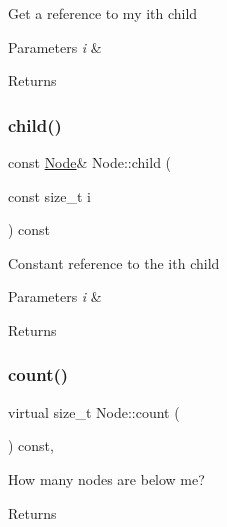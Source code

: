 Get a reference to my i\textquotesingle{}th child 
\begin{DoxyParams}{Parameters}
{\em i} & \\
\hline
\end{DoxyParams}
\begin{DoxyReturn}{Returns}

\end{DoxyReturn}
\mbox{\label{class_node_acc2b20cdba470853f1c137e26546ed3c}} 
\subsubsection{\texorpdfstring{child()}{child()}\hspace{0.1cm}{\footnotesize\ttfamily [2/2]}}
{\footnotesize\ttfamily const \hyperlink{class_node}{Node}\& Node\+::child (\begin{DoxyParamCaption}\item[{const size\+\_\+t}]{i }\end{DoxyParamCaption}) const\hspace{0.3cm}{\ttfamily [inline]}}

Constant reference to the i\textquotesingle{}th child 
\begin{DoxyParams}{Parameters}
{\em i} & \\
\hline
\end{DoxyParams}
\begin{DoxyReturn}{Returns}

\end{DoxyReturn}
\mbox{\label{class_node_abd387b27e1deb45b789ad7b7abd8c6e6}} 
\subsubsection{\texorpdfstring{count()}{count()}\hspace{0.1cm}{\footnotesize\ttfamily [1/2]}}
{\footnotesize\ttfamily virtual size\+\_\+t Node\+::count (\begin{DoxyParamCaption}{ }\end{DoxyParamCaption}) const\hspace{0.3cm}{\ttfamily [inline]}, {\ttfamily [virtual]}}

How many nodes are below me? \begin{DoxyReturn}{Returns}

\end{DoxyReturn}
\mbox{\label{class_node_a0cc58478d98361566830a8d3db745718}} 
